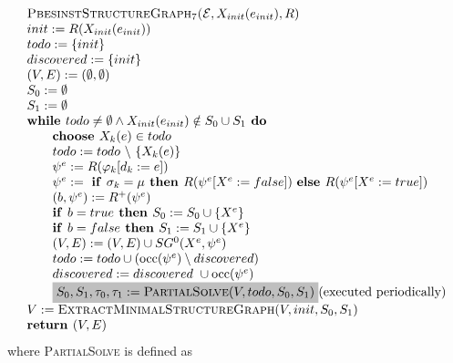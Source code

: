 \documentclass{article}
\newcommand{\Space}{\text{\ }}
\newcommand{\If}{\text{\textbf{if }}}
\newcommand{\Do}{\text{\textbf{ do }}}
\newcommand{\Then}{\text{\textbf{ then }}}
\newcommand{\Else}{\text{\textbf{else }}}
\newcommand{\While}{\text{\textbf{while }}}
\newcommand{\Choose}{\text{\textbf{choose }}}
\newcommand{\Return}{\text{\textbf{return }}}
\begin{document}
\begin{equation*}
\begin{array}{l}
\textsc{PbesinstStructureGraph$_{7}$(}\mathcal{E}, X_{init}(e_{init}), R) \\ 
init:=R(X_{init}(e_{init})) \\
todo:=\{init\} \\
discovered:=\{init\} \\
(V,E) :=(\emptyset ,\emptyset ) \\ 
S_0:= \emptyset \\
S_1:= \emptyset \\
\While todo \neq \emptyset \wedge X_{init}(e_{init}) \notin S_0 \cup S_1 \Do \\ 
\qquad \Choose X_{k}(e)\in todo \\ 
\qquad todo:=todo\ \backslash \ \{X_{k}(e)\} \\ 
\qquad \psi ^{e}:=R(\varphi _{k}[d_{k}:=e]) \\ 
\qquad \psi^e := \Space \If \sigma_k = \mu \Then R(\psi^e[X^e := false])
\Space \Else R(\psi^e[X^e := true]) \\
\qquad (b,\psi^e) := R^+(\psi^e) \\
\qquad \If b = true \Then S_0 := S_0 \cup \{ X^e \} \\
\qquad \If b = false \Then S_1 := S_1 \cup \{ X^e \} \\
\qquad (V,E) := (V,E) \cup SG^{0}(X^{e},\psi ^{e}) \\ 
\qquad todo:=todo\cup (\mathrm{occ}(\psi ^{e})\setminus discovered) \\
\qquad discovered:=discovered\ \cup \mathrm{occ}(\psi ^{e}) \\
\qquad \colorbox{lightgray}{$
S_0, S_1,\tau_0,\tau_1 := \textsc{PartialSolve}(V,todo,S_0,S_1) $} \text{(executed periodically)} \\
V := \textsc{ExtractMinimalStructureGraph}(V, init, S_0, S_1) \\
\Return (V, E)
\end{array}
\end{equation*}
where \textsc{PartialSolve} is defined as
\end{document}
